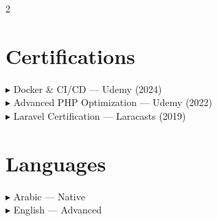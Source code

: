 \documentclass[10pt, a4paper]{article}
\begin{document}
\begin{paracol}{2}
\section{Certifications}

{\small\color{Mid}
▸ Docker \& CI/CD — Udemy (2024)\\[3pt]
▸ Advanced PHP Optimization — Udemy (2022)\\[3pt]
▸ Laravel Certification — Laracasts (2019)%
}

\section{Languages}

{\small\color{Mid}
▸ Arabic — Native\\[3pt]
▸ English — Advanced%
}

\end{paracol}
\end{document}
